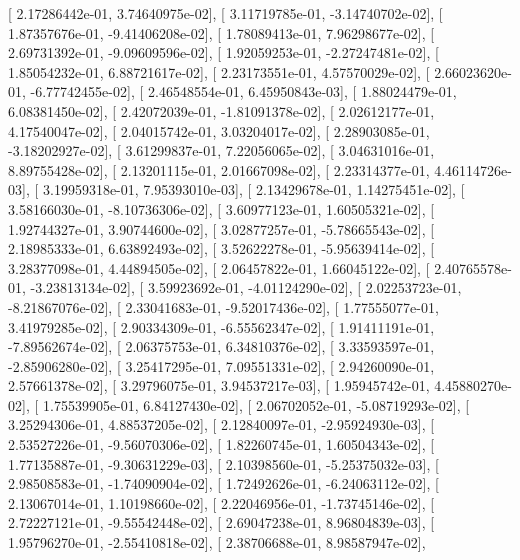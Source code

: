 \documentclass{article}
\begin{document}
       [  2.17286442e-01,   3.74640975e-02],
       [  3.11719785e-01,  -3.14740702e-02],
       [  1.87357676e-01,  -9.41406208e-02],
       [  1.78089413e-01,   7.96298677e-02],
       [  2.69731392e-01,  -9.09609596e-02],
       [  1.92059253e-01,  -2.27247481e-02],
       [  1.85054232e-01,   6.88721617e-02],
       [  2.23173551e-01,   4.57570029e-02],
       [  2.66023620e-01,  -6.77742455e-02],
       [  2.46548554e-01,   6.45950843e-03],
       [  1.88024479e-01,   6.08381450e-02],
       [  2.42072039e-01,  -1.81091378e-02],
       [  2.02612177e-01,   4.17540047e-02],
       [  2.04015742e-01,   3.03204017e-02],
       [  2.28903085e-01,  -3.18202927e-02],
       [  3.61299837e-01,   7.22056065e-02],
       [  3.04631016e-01,   8.89755428e-02],
       [  2.13201115e-01,   2.01667098e-02],
       [  2.23314377e-01,   4.46114726e-03],
       [  3.19959318e-01,   7.95393010e-03],
       [  2.13429678e-01,   1.14275451e-02],
       [  3.58166030e-01,  -8.10736306e-02],
       [  3.60977123e-01,   1.60505321e-02],
       [  1.92744327e-01,   3.90744600e-02],
       [  3.02877257e-01,  -5.78665543e-02],
       [  2.18985333e-01,   6.63892493e-02],
       [  3.52622278e-01,  -5.95639414e-02],
       [  3.28377098e-01,   4.44894505e-02],
       [  2.06457822e-01,   1.66045122e-02],
       [  2.40765578e-01,  -3.23813134e-02],
       [  3.59923692e-01,  -4.01124290e-02],
       [  2.02253723e-01,  -8.21867076e-02],
       [  2.33041683e-01,  -9.52017436e-02],
       [  1.77555077e-01,   3.41979285e-02],
       [  2.90334309e-01,  -6.55562347e-02],
       [  1.91411191e-01,  -7.89562674e-02],
       [  2.06375753e-01,   6.34810376e-02],
       [  3.33593597e-01,  -2.85906280e-02],
       [  3.25417295e-01,   7.09551331e-02],
       [  2.94260090e-01,   2.57661378e-02],
       [  3.29796075e-01,   3.94537217e-03],
       [  1.95945742e-01,   4.45880270e-02],
       [  1.75539905e-01,   6.84127430e-02],
       [  2.06702052e-01,  -5.08719293e-02],
       [  3.25294306e-01,   4.88537205e-02],
       [  2.12840097e-01,  -2.95924930e-03],
       [  2.53527226e-01,  -9.56070306e-02],
       [  1.82260745e-01,   1.60504343e-02],
       [  1.77135887e-01,  -9.30631229e-03],
       [  2.10398560e-01,  -5.25375032e-03],
       [  2.98508583e-01,  -1.74090904e-02],
       [  1.72492626e-01,  -6.24063112e-02],
       [  2.13067014e-01,   1.10198660e-02],
       [  2.22046956e-01,  -1.73745146e-02],
       [  2.72227121e-01,  -9.55542448e-02],
       [  2.69047238e-01,   8.96804839e-03],
       [  1.95796270e-01,  -2.55410818e-02],
       [  2.38706688e-01,   8.98587947e-02],
\end{document}
